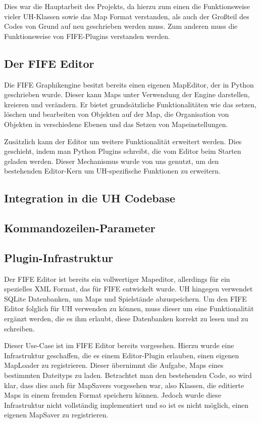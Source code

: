 Dies war die Hauptarbeit des Projekts, da hierzu zum einen die Funktionsweise vieler
UH-Klassen sowie das Map Format verstanden, als auch der Großteil des Codes von Grund
auf neu geschrieben werden muss. Zum anderen muss die Funktionsweise von FIFE-Plugins
verstanden werden.

\subsection{Der FIFE Editor}
Die FIFE Graphikengine besitzt bereits einen eigenen MapEditor, der in Python geschrieben
wurde. Dieser kann Maps unter
Verwendung der Engine darstellen, kreieren und verändern. Er bietet grundsätzliche
Funktionalitäten wie das setzen, löschen und bearbeiten von Objekten auf der Map,
die Organisation von Objekten in verschiedene Ebenen und das Setzen von Mapeinstellungen.

Zusätzlich kann der Editor um weitere Funktionalität erweitert werden. Dies geschieht,
indem man Python Plugins schreibt, die vom Editor beim Starten geladen werden. Dieser
Mechanismus wurde von uns genutzt, um den bestehenden Editor-Kern um UH-spezifische
Funktionen zu erweitern.

\subsection{Integration in die UH Codebase}

\subsection{Kommandozeilen-Parameter}

\subsection{Plugin-Infrastruktur}
Der FIFE Editor ist bereits ein vollwertiger Mapeditor, allerdings für ein spezielles XML Format,
das für FIFE entwickelt wurde. UH hingegen verwendet SQLite Datenbanken, um Maps und Spielstände
abzuspeichern. Um den FIFE Editor folglich für UH verwenden zu können, muss dieser um eine
Funktionalität ergänzt werden, die es ihm erlaubt, diese Datenbanken korrekt zu lesen und zu schreiben.

Dieser Use-Case ist im FIFE Editor bereits vorgesehen. Hierzu wurde eine Infrastruktur geschaffen, die
es einem Editor-Plugin erlauben, einen eigenen MapLoader zu registrieren. Dieser übernimmt die
Aufgabe, Maps eines bestimmten Dateityps zu laden. Betrachtet man den bestehenden Code, so wird klar,
dass dies auch für MapSavers vorgesehen war, also Klassen, die editierte Maps in einem fremden Format
speichern können. Jedoch wurde diese Infrastruktur nicht vollständig implementiert und so ist es
nicht möglich, einen eigenen MapSaver zu registrieren.

